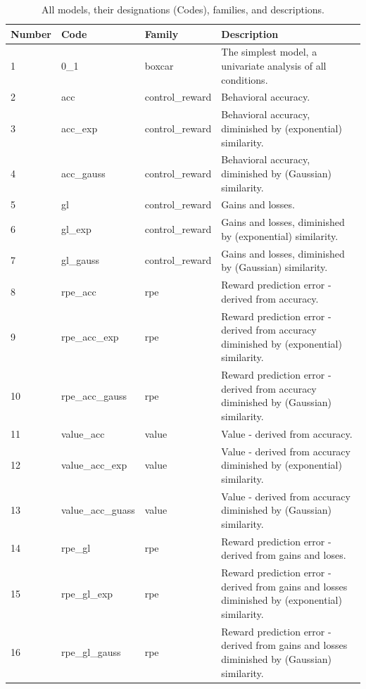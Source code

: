 \documentclass[doc,12pt]{apa}        %
\begin{document}
\begin{center}
    \begin{longtable}{ | l | l | l | p{6cm} |}
    \caption{All models, their designations (Codes), families, and descriptions.}\\
    \hline
    Number & Code & Family & Description \\ \hline
         1 & 0\_1 & boxcar & The simplest model, a univariate analysis of all conditions. \\ \hline
         2 & acc & control\_reward & Behavioral accuracy. \\ \hline
         3 & acc\_exp & control\_reward & Behavioral accuracy, diminished by (exponential) similarity. \\ \hline
         4 & acc\_gauss & control\_reward & Behavioral accuracy, diminished by (Gaussian) similarity. \\ \hline
         5 & gl & control\_reward & Gains and losses. \\ \hline 
         6 & gl\_exp & control\_reward & Gains and losses, diminished by (exponential) similarity. \\ \hline
         7 & gl\_gauss & control\_reward & Gains and losses, diminished by (Gaussian) similarity. \\ \hline
         8 & rpe\_acc & rpe & Reward prediction error - derived from accuracy. \\ \hline
         9 & rpe\_acc\_exp & rpe & Reward prediction error - derived from accuracy diminished by (exponential) similarity. \\ \hline
        10 & rpe\_acc\_gauss & rpe & Reward prediction error - derived from accuracy diminished by (Gaussian) similarity. \\ \hline
        11 & value\_acc & value & Value - derived from accuracy. \\ \hline
        12 & value\_acc\_exp & value & Value - derived from accuracy diminished by (exponential) similarity. \\ \hline
        13 & value\_acc\_guass & value & Value - derived from accuracy diminished by (Gaussian) similarity. \\ \hline
        14 & rpe\_gl & rpe & Reward prediction error - derived from gains and loses. \\ \hline
        15 & rpe\_gl\_exp & rpe & Reward prediction error - derived from gains and losses diminished by (exponential) similarity. \\ \hline
        16 & rpe\_gl\_gauss & rpe & Reward prediction error - derived from gains and losses diminished by (Gaussian) similarity. \\ \hline

\end{longtable}
\end{center}
\end{document}
